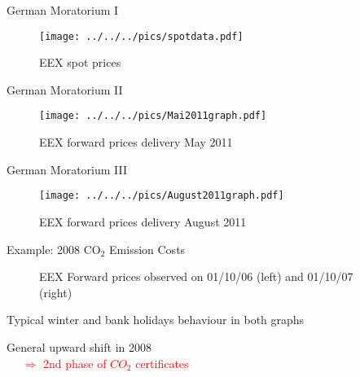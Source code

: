 


{German Moratorium I}

\begin{figure}[htbp]

  \texttt{[image: ../../../pics/spotdata.pdf]}
    \caption{EEX spot prices}
\end{figure}

{German Moratorium II}

\begin{figure}[htbp]

  \texttt{[image: ../../../pics/Mai2011graph.pdf]}
    \caption{EEX forward prices delivery May 2011}
\end{figure}

{German Moratorium III}

\begin{figure}[htbp]

  \texttt{[image: ../../../pics/August2011graph.pdf]}
    \caption{EEX forward prices delivery August 2011}
\end{figure}

{Example: 2008 CO$_2$ Emission Costs}
\vspace{-0.5cm}

\begin{figure}[htbp]
  \centering
  \caption{EEX Forward prices observed on 01/10/06 (left) and 01/10/07 (right)}
\end{figure}






	Typical winter and bank holidays behaviour in both graphs

	General upward shift in 2008 \\ \vspace{0.2cm}
\textcolor{red}{$~~~~~~ \Rightarrow$ 2nd phase of $CO_2$ certificates}






